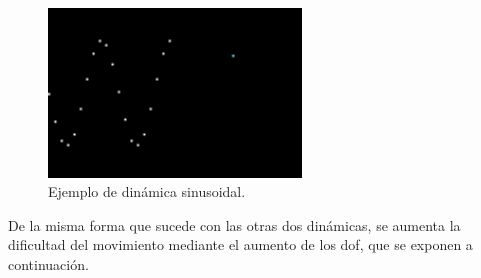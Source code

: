 \begin{figure}[H]
		\begin{center}
			\includegraphics[width=0.6\textwidth]{ figures/samples/sinusoidal_sample.png}
			\caption{Ejemplo de dinámica sinusoidal.}
			\label{fig.sin}
		\end{center}
\end{figure}
\vspace{-10pt}
De la misma forma que sucede con las otras dos dinámicas, se aumenta la dificultad del movimiento mediante el aumento  de los \acrshort{dof}, que se exponen a continuación.
\vspace{150pt}
